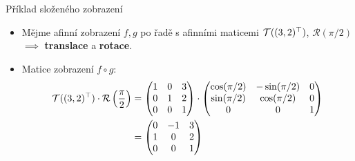 \begin{frame}[t]{Příklad složeného zobrazení}
    \begin{itemize}
        \item Mějme afinní zobrazení $f,g$ po řadě s afinními maticemi $\mathcal{T}((3,2)^\top)$, $\mathcal{R}(\pi/2)$ $\implies$ \textbf{translace} a \textbf{rotace}.
        \item Matice zobrazení $f\circ g$:
        \begin{align*}
            \mathcal{T}((3,2)^\top)\cdot\mathcal{R}\left(\dfrac{\pi}{2}\right)&=\left(\begin{matrix}
                1 & 0 & 3\\
                0 & 1 & 2\\
                0 & 0 & 1
            \end{matrix}\right)\cdot\left(\begin{matrix}
                \cos(\pi/2) & -\sin(\pi/2) & 0\\
                \sin(\pi/2) & \cos(\pi/2) & 0\\
                0 & 0 & 1
            \end{matrix}\right)\\
            &=\left(\begin{matrix}
                0 & -1 & 3\\
                1 & 0 & 2\\
                0 & 0 & 1
            \end{matrix}\right)
        \end{align*}
    \end{itemize}
\end{frame}